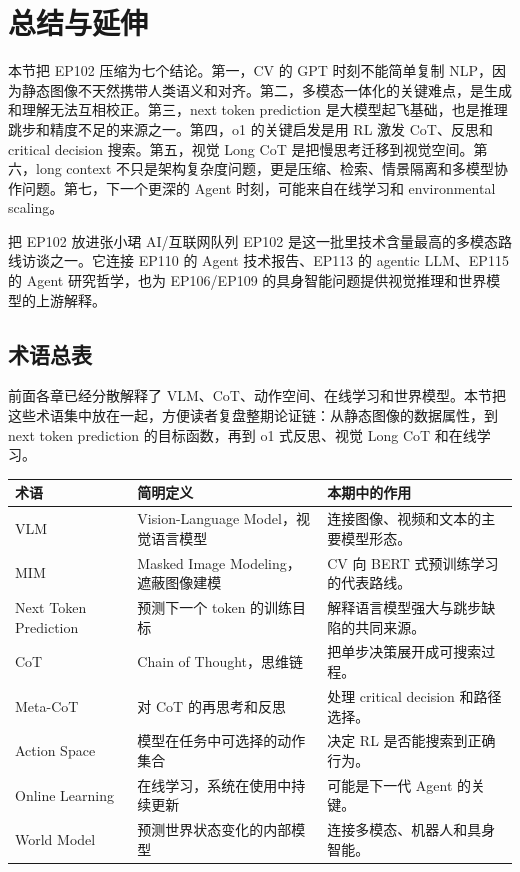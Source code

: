 \section{总结与延伸}

本节把 EP102 压缩为七个结论。第一，CV 的 GPT 时刻不能简单复制 NLP，因为静态图像不天然携带人类语义和对齐。第二，多模态一体化的关键难点，是生成和理解无法互相校正。第三，next token prediction 是大模型起飞基础，也是推理跳步和精度不足的来源之一。第四，o1 的关键启发是用 RL 激发 CoT、反思和 critical decision 搜索。第五，视觉 Long CoT 是把慢思考迁移到视觉空间。第六，long context 不只是架构复杂度问题，更是压缩、检索、情景隔离和多模型协作问题。第七，下一个更深的 Agent 时刻，可能来自在线学习和 environmental scaling。

\begin{importantbox}{把 EP102 放进张小珺 AI/互联网队列}
EP102 是这一批里技术含量最高的多模态路线访谈之一。它连接 EP110 的 Agent 技术报告、EP113 的 agentic LLM、EP115 的 Agent 研究哲学，也为 EP106/EP109 的具身智能问题提供视觉推理和世界模型的上游解释。
\end{importantbox}

\subsection{术语总表}

前面各章已经分散解释了 VLM、CoT、动作空间、在线学习和世界模型。本节把这些术语集中放在一起，方便读者复盘整期论证链：从静态图像的数据属性，到 next token prediction 的目标函数，再到 o1 式反思、视觉 Long CoT 和在线学习。

\noindent\begin{tabularx}{\textwidth}{p{}p{}X}
\toprule
术语 & 简明定义 & 本期中的作用 \\
\midrule
VLM & Vision-Language Model，视觉语言模型 & 连接图像、视频和文本的主要模型形态。 \\
MIM & Masked Image Modeling，遮蔽图像建模 & CV 向 BERT 式预训练学习的代表路线。 \\
Next Token Prediction & 预测下一个 token 的训练目标 & 解释语言模型强大与跳步缺陷的共同来源。 \\
CoT & Chain of Thought，思维链 & 把单步决策展开成可搜索过程。 \\
Meta-CoT & 对 CoT 的再思考和反思 & 处理 critical decision 和路径选择。 \\
Action Space & 模型在任务中可选择的动作集合 & 决定 RL 是否能搜索到正确行为。 \\
Online Learning & 在线学习，系统在使用中持续更新 & 可能是下一代 Agent 的关键。 \\
World Model & 预测世界状态变化的内部模型 & 连接多模态、机器人和具身智能。 \\
\bottomrule
\end{tabularx}

